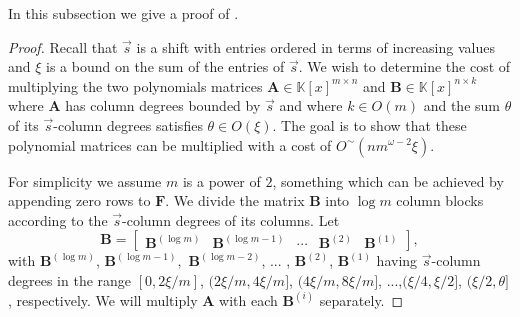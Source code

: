In this subsection we give a proof of .
\begin{proof}
Recall that $\vec{s}$ is a shift with entries ordered in terms of
increasing values and $\xi$ is a bound on the sum of the entries
of $\vec{s}$. We wish to determine the cost of multiplying the two
polynomials matrices $\mathbf{A}\in\mathbb{K}\left[x\right]^{m\times n}$
and $\mathbf{B}\in\mathbb{K}\left[x\right]^{n\times k}$ where $\mathbf{A}$
has column degrees bounded by $\vec{s}$ and where $k\in O\left(m\right)$
and the sum $\theta$ of its $\vec{s}$-column degrees satisfies $\theta\in O\left(\xi\right)$.
The goal is to show that these polynomial matrices can be multiplied
with a cost of $O^{\sim}(nm^{\omega-2}\xi)$.

For simplicity we assume $m$ is a power of $2$, something which
can be achieved by appending zero rows to $\mathbf{F}$. We divide
the matrix $\mathbf{B}$ into $\log m$ column blocks according to
the $\vec{s}$-column degrees of its columns. Let 
\[
\mathbf{B}=\left[\begin{array}{ccccc}
\mathbf{B}^{\left(\log m\right)} & \mathbf{B}^{\left(\log m-1\right)} & \cdots & \mathbf{B}^{\left(2\right)} & \mathbf{B}^{\left(1\right)}\end{array}\right],
\]
 with $\mathbf{B}^{\left(\log m\right)}$, $\mathbf{B}^{\left(\log m-1\right)},$
$\mathbf{B}^{\left(\log m-2\right)}$, ... , $\mathbf{B}^{\left(2\right)}$,
$\mathbf{B}^{\left(1\right)}$ having $\vec{s}$-column degrees in
the range $\left[0,2\xi/m\right]$, $(2\xi/m,4\xi/m]$, $(4\xi/m,8\xi/m]$,
...,$(\xi/4,\xi/2]$, $(\xi/2,\theta]$, respectively. We will multiply
$\mathbf{A}$ with each $\mathbf{B}^{\left(i\right)}$ separately.


\end{proof}
